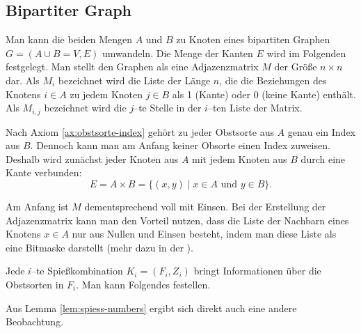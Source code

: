\subsection{Bipartiter Graph}
Man kann die beiden Mengen $A$ und $B$ zu Knoten eines bipartiten Graphen $G = (A \cup B = V, E)$ umwandeln.
Die Menge der Kanten $E$ wird im Folgenden festgelegt.
Man stellt den Graphen als eine Adjazenzmatrix $M$ der Größe $n \times n$ dar. 
Als $M_i$ bezeichnet wird die Liste der Länge $n$,
die die Beziehungen des Knotens
$i \in A$ zu jedem Knoten $j \in B$ als 1 (Kante) oder 0 (keine Kante) enthält.
Als $M_{i, j}$ bezeichnet wird die $j$--te Stelle in der $i$--ten Liste der Matrix.

Nach Axiom \ref{ax:obstsorte-index} gehört zu jeder Obstsorte aus $A$ genau ein Index aus $B$.
Dennoch kann man am Anfang keiner Obsorte einen Index zuweisen.
Deshalb wird zunächst jeder Knoten aus $A$ mit jedem Knoten aus $B$ durch eine Kante verbunden:
\[
E = A\times B = \{(x, y) \mid  x \in A \text{ und } y \in B\}.
\]



Am Anfang ist $M$ dementsprechend voll mit Einsen.
Bei der Erstellung der Adjazenzmatrix kann man den Vorteil nutzen, dass die 
Liste der Nachbarn eines Knotens $x \in A$ nur aus Nullen und Einsen besteht, indem man
diese Liste als eine Bitmaske darstellt (mehr dazu in der ).

Jede $i$--te Spießkombination $K_i = (F_i, Z_i)$ bringt Informationen über die Obstsorten in $F_i$.
Man kann Folgendes festellen. 






\noindent Aus Lemma \ref{lem:spiess-numbers} ergibt sich direkt auch eine andere Beobachtung.




